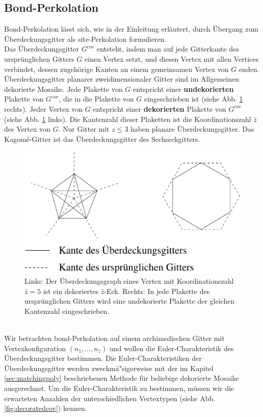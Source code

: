 \subsection{Bond-Perkolation}
\label{sec:chibond}
Bond-Perkolation l\"asst sich, wie in der Einleitung erl\"autert, durch \"Ubergang zum \"Uberdeckungsgitter als site-Perkolation formulieren.\\
Das \"Uberdeckungsgitter $G^{cov}$ entsteht, indem man auf jede Gitterkante des urspr\"unglichen Gitters $G$ einen Vertex setzt, und diesen Vertex mit allen Vertices verbindet, dessen zugeh\"orige Kanten an einem gemeinsamen Vertex von $G$ enden. \"Uberdeckungsgitter planarer zweidimensionaler Gitter sind im Allgemeinen dekorierte Mosaike. Jede Plakette von $G$ entspricht einer \textbf{undekorierten} Plakette von $G^{cov}$, die in die Plakette von $G$ eingeschrieben ist (siehe Abb. \ref{fig:covering} rechts). Jeder Vertex von $G$ entspricht einer \textbf{dekorierten} Plakette von $G^{cov}$ (siehe Abb. \ref{fig:covering} links). Die Kantenzahl dieser Plaketten ist die Koordinationszahl $\bar{z}$ des Vertex von $G$. Nur Gitter mit $z\leq3$ haben planare \"Uberdeckungsgitter. Das Kagom\'e-Gitter ist das \"Uberdeckungsgitter des Sechseckgitters.\begin{figure}[htbp]
  \centering
  \includegraphics{./Schranken-figs/covering}
  \caption{Links: Der \"Uberdeckungsgraph eines Vertex mit Koordinationszahl $\bar{z}=5$ ist ein dekoriertes $\bar{z}$-Eck. Rechts: In jede Plakette des urspr\"unglichen Gitters wird eine undekorierte Plakette der gleichen Kantenzahl eingeschrieben.}
  \label{fig:covering}
\end{figure}
\\Wir betrachten bond-Perkolation auf einem archimedischen Gitter mit Vertexkonfiguration $(n_1,\ldots,n_{\bar{z}})$ und wollen die Euler-Charakteristik des \"Uberdeckungsgitter bestimmen. Die Euler-Charakteristiken der \"Uberdeckungsgitter werden zweckm\"a"siger\-weise mit der im Kapitel \ref{sec:matchingpoly} beschriebenen Methode f\"ur beliebige dekorierte Mosaike ausgerechnet. Um die Euler-Charakteristik zu bestimmen, m\"ussen wir die erwarteten Anzahlen der unterschiedlichen Vertextypen (siehe Abb. \ref{fig:decoratedcov}) kennen. 
